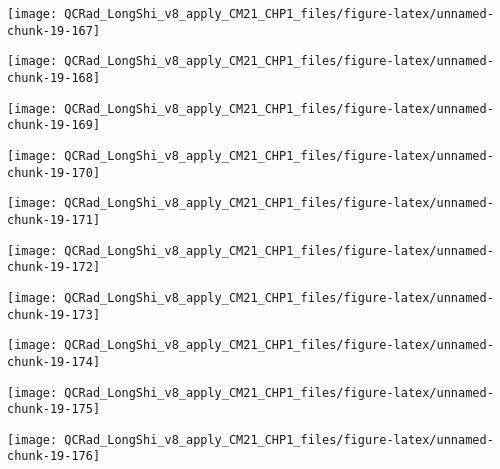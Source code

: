 \documentclass[
  10pt,
  a4paper,oneside]{article}
\begin{document}
\begin{center}\texttt{[image: QCRad\_LongShi\_v8\_apply\_CM21\_CHP1\_files/figure-latex/unnamed-chunk-19-167]} \end{center}

\begin{center}\texttt{[image: QCRad\_LongShi\_v8\_apply\_CM21\_CHP1\_files/figure-latex/unnamed-chunk-19-168]} \end{center}

\begin{center}\texttt{[image: QCRad\_LongShi\_v8\_apply\_CM21\_CHP1\_files/figure-latex/unnamed-chunk-19-169]} \end{center}

\begin{center}\texttt{[image: QCRad\_LongShi\_v8\_apply\_CM21\_CHP1\_files/figure-latex/unnamed-chunk-19-170]} \end{center}

\begin{center}\texttt{[image: QCRad\_LongShi\_v8\_apply\_CM21\_CHP1\_files/figure-latex/unnamed-chunk-19-171]} \end{center}

\begin{center}\texttt{[image: QCRad\_LongShi\_v8\_apply\_CM21\_CHP1\_files/figure-latex/unnamed-chunk-19-172]} \end{center}

\begin{center}\texttt{[image: QCRad\_LongShi\_v8\_apply\_CM21\_CHP1\_files/figure-latex/unnamed-chunk-19-173]} \end{center}

\begin{center}\texttt{[image: QCRad\_LongShi\_v8\_apply\_CM21\_CHP1\_files/figure-latex/unnamed-chunk-19-174]} \end{center}

\begin{center}\texttt{[image: QCRad\_LongShi\_v8\_apply\_CM21\_CHP1\_files/figure-latex/unnamed-chunk-19-175]} \end{center}

\begin{center}\texttt{[image: QCRad\_LongShi\_v8\_apply\_CM21\_CHP1\_files/figure-latex/unnamed-chunk-19-176]} \end{center}
\end{document}
